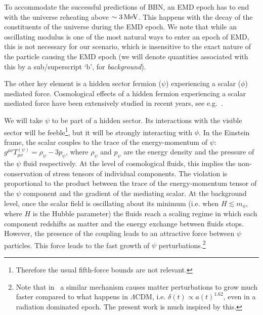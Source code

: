 \documentclass[a4paper, amsfonts, amssymb, amsmath, reprint, showkeys, nofootinbib, twoside, superscriptaddress]{revtex4-1}
\newcommand{\LCDM}{$\Lambda$CDM}
\begin{document}
To accommodate the successful predictions of BBN, an EMD epoch has to end with the universe reheating above $\sim 3 \, \rm{MeV}$. This happens with the decay of the constituents of the universe during the EMD epoch. We note that while an oscillating modulus is one of the most natural ways to enter an epoch of EMD, this is not necessary for our scenario, which is insensitive to the exact nature of the particle causing the EMD epoch (we will denote quantities associated with this by a sub/superscript ‘b', for \textit{background}).\\


The other key element is a hidden sector fermion ($\psi$) experiencing a scalar ($\phi$) mediated force. Cosmological effects of a hidden fermion experiencing a scalar mediated force have been extensively studied in recent years, see e.g.~\cite{Das:2005yj, Amendola:1999er, Vagnozzi:2021quy, Tsai:2021irw, Savastano:2019zpr,  Amendola:2017xhl, Damour:1990tw, hep-th/9408025, Amendola:1999er, gr-qc/0108016, astro-ph/0303145,
astro-ph/0208032, astro-ph/0306343, astro-ph/0212518, astro-ph/0307350, Amendola:2003wa, Domenech:2021uyx}.

We will take $\psi$ to be part of a hidden sector. Its interactions with the visible sector will be feeble\footnote{Therefore the usual fifth-force bounds are not relevant.}, but it will be strongly interacting with $\phi$. In the Einstein frame, the scalar couples to the trace of the energy-momentum of $\psi$: $g^{\mu \nu} T_{\mu \nu}^{(\psi)} = \rho_{\psi} - 3 p_\psi$, where $\rho_\psi$ and $p_\psi$ are the energy density and the pressure of the $\psi$ fluid respectively. At the level of cosmological fluids, this implies the non-conservation of stress tensors of individual components. The violation is proportional to the product between the trace of the energy-momentum tensor of the $\psi$ component and the gradient of the mediating scalar. At the background level, once the scalar field is oscillating about its minimum (i.e. when $H \lesssim m_\phi$, where $H$ is the Hubble parameter) the fluids reach a scaling regime in which each component redshifts as matter and the energy exchange between fluids stops. However, the presence of the coupling leads to an attractive force between $\psi$ particles. This force leads to the fast growth of $\psi$ perturbations.\footnote{Note that in~\cite{Savastano:2019zpr} a similar mechanism causes matter perturbations to grow much faster compared to what happens in \LCDM, i.e. $\delta(t) \propto a(t)^{1.62}$, even in a radiation dominated epoch. The present work is much inspired by this.}\\
 
\end{document}
